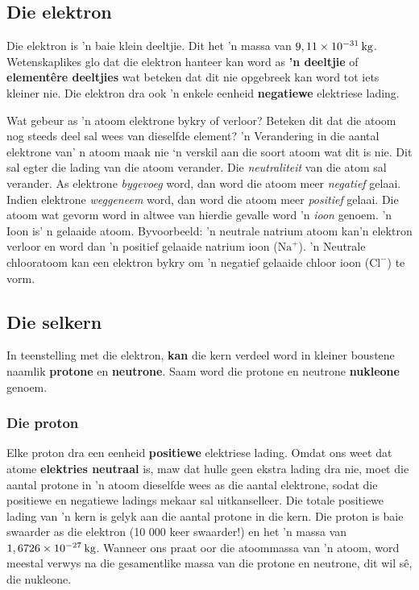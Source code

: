             \subsection*{Die elektron}
            \nopagebreak
        \label{m38745*id255241}
Die elektron is 'n baie klein deeltjie. Dit het 'n massa van $9,11\ensuremath{\times}{10}^{-31}\phantom{\rule{2pt}{0ex}}\text{kg}$. Wetenskaplikes glo dat die elektron hanteer kan word as \textbf{'n deeltjie} of \textbf{element\^{e}re deeltjies} wat beteken dat dit nie opgebreek kan word tot iets kleiner nie. Die elektron dra ook 'n enkele eenheid \textbf{negatiewe} elektriese lading.\par 
\label{m38745*eip-222}
Wat gebeur as 'n atoom elektrone bykry of verloor? Beteken dit dat die atoom nog steeds deel sal wees van dieselfde element? 'n Verandering in die aantal elektrone van' n atoom maak nie ‘n verskil aan die soort atoom wat dit is nie. Dit sal egter die lading van die atoom verander. Die \textsl{neutraliteit} van die atom sal verander. As elektrone \textsl{bygevoeg} word, dan word die atoom meer \textsl{negatief} gelaai. Indien elektrone \textsl{weggeneem} word, dan word die atoom meer \textsl{positief} gelaai. Die atoom wat gevorm word in altwee van hierdie gevalle word 'n \textsl{ioon} genoem. 'n Ioon is' n gelaaide atoom. Byvoorbeeld: 'n neutrale natrium atoom kan'n elektron verloor en word dan 'n positief gelaaide natrium ioon ($\text{Na}^{+}$). 'n Neutrale chlooratoom kan een elektron bykry om 'n negatief gelaaide chloor ioon ($\text{Cl}^{-}$) te vorm.\par 
      \label{m38745*uid11}
            \subsection*{Die selkern}
            \nopagebreak
        \label{m38745*id255305}
In teenstelling met die elektron, \textbf{kan} die kern verdeel word in kleiner boustene naamlik \textbf{protone} en \textbf{neutrone}. Saam word die protone en neutrone \textbf{nukleone} genoem.\par 
        \label{m38745*uid12}
            \subsubsection*{Die proton}
            \nopagebreak
          \label{m38745*id255338}
Elke proton dra een eenheid \textbf{positiewe} elektriese lading. Omdat ons weet dat atome \textbf{elektries neutraal} is, maw dat hulle geen ekstra lading dra nie, moet die aantal protone in 'n atoom dieselfde wees as die aantal elektrone, sodat die positiewe en negatiewe ladings mekaar sal uitkanselleer. Die totale positiewe lading van 'n kern is gelyk aan die aantal protone in die kern. Die proton is baie swaarder as die elektron (10 000 keer swaarder!) en het 'n massa van $1,6726\ensuremath{\times}{10}^{-27}\phantom{\rule{2pt}{0ex}}\text{kg}$. Wanneer ons praat oor die atoommassa van 'n atoom, word meestal verwys na die gesamentlike massa van die protone en neutrone, dit wil s\^{e}, die nukleone.\par 
        \label{m38745*uid13}
